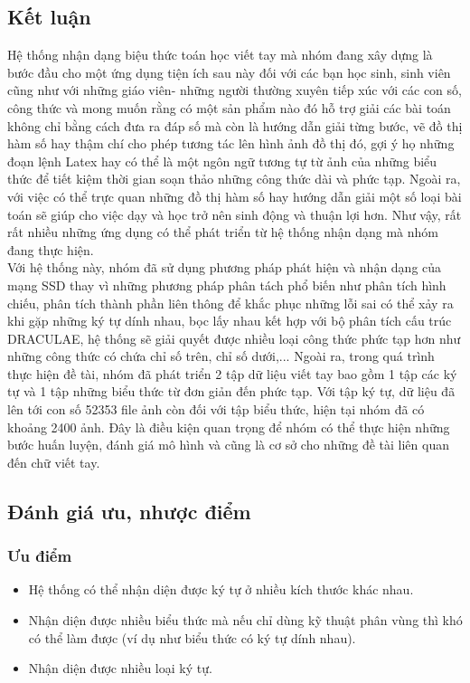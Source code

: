 \documentclass[a4paper,12pt]{article}
\begin{document}
	\subsection{Kết luận}
	Hệ thống nhận dạng biệu thức toán học viết tay mà nhóm đang xây dựng là bước đầu cho một ứng dụng tiện ích sau này đối với các bạn học sinh, sinh viên cũng như với những giáo viên- những người thường xuyên tiếp xúc với các con số, công thức và mong muốn rằng có một sản phẩm nào đó hỗ trợ giải các bài toán không chỉ bằng cách đưa ra đáp số mà còn là hướng dẫn giải từng bước, vẽ đồ thị hàm số hay thậm chí cho phép tương tác lên hình ảnh đồ thị đó, gợi ý họ những đoạn lệnh Latex hay có thể là một ngôn ngữ tương tự từ ảnh của những biểu thức để tiết kiệm thời gian soạn thảo những công thức dài và phức tạp. Ngoài ra, với việc có thể trực quan những đồ thị hàm số hay hướng dẫn giải một số loại bài toán sẽ giúp cho việc dạy và học trở nên sinh động và thuận lợi hơn. Như vậy, rất rất nhiều những ứng dụng có thể phát triển từ hệ thống nhận dạng mà nhóm đang thực hiện. \\
	Với hệ thống này, nhóm đã sử dụng phương pháp phát hiện và nhận dạng của mạng SSD thay vì những phương pháp phân tách phổ biến như phân tích hình chiếu, phân tích thành phần liên thông để khắc phục những lỗi sai có thể xảy ra khi gặp những ký tự dính nhau, bọc lấy nhau kết hợp với bộ phân tích cấu trúc DRACULAE, hệ thống sẽ giải quyết được nhiều loại công thức phức tạp hơn như những công thức có chứa chỉ số trên, chỉ số dưới,... 
	Ngoài ra, trong quá trình thực hiện đề tài, nhóm đã phát triển 2 tập dữ liệu viết tay bao gồm 1 tập các ký tự và 1 tập những biểu thức từ đơn giản đến phức tạp. Với tập ký tự, dữ liệu đã lên tới con số 52353 file ảnh còn đối với tập biểu thức, hiện tại nhóm đã có khoảng 2400 ảnh. Đây là điều kiện quan trọng để nhóm có thể thực hiện những bước huấn luyện, đánh giá mô hình và cũng là cơ sở cho những đề tài liên quan đến chữ viết tay. 
	\subsection{Đánh giá ưu, nhược điểm}
	
	\subsubsection{Ưu điểm}
	
	\begin{itemize}
		\item Hệ thống có thể nhận diện được ký tự ở nhiều kích thước khác nhau.
		\item Nhận diện được nhiều biểu thức mà nếu chỉ dùng kỹ thuật phân vùng thì khó có thể làm được (ví dụ như biểu thức có ký tự dính nhau).
		\item Nhận diện được nhiều loại ký tự.
	\end{itemize}
	
\end{document}
